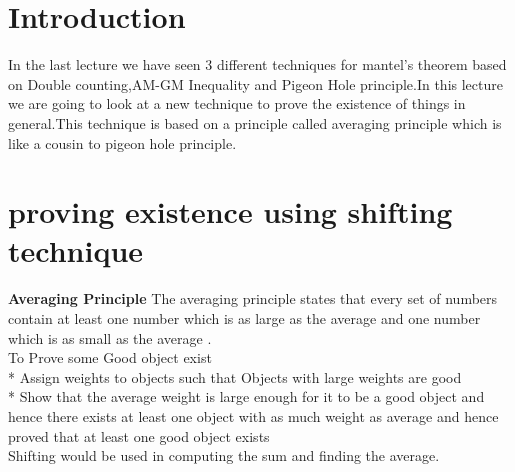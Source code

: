 
\section{Introduction}
In the last lecture we have seen 3 different techniques for mantel's theorem based on Double counting,AM-GM Inequality and Pigeon Hole principle.In this lecture we are going to look at a new technique to prove the existence of things in general.This technique is based on a principle called averaging principle which is like a cousin to pigeon hole principle.\\

\section{ proving existence using shifting technique}
\textbf{Averaging Principle}
The averaging principle states that every set of numbers contain at least one number which is as large as the average and one number which is as small as the average .\\
To Prove some Good object exist\\
* Assign weights to objects such that Objects with large weights are good\\
* Show that the average weight is large enough for it to be a good object 
and hence there exists at least one object with as much weight as average and hence proved that at least one good object exists\\
Shifting would be used in computing the sum and finding the average.

